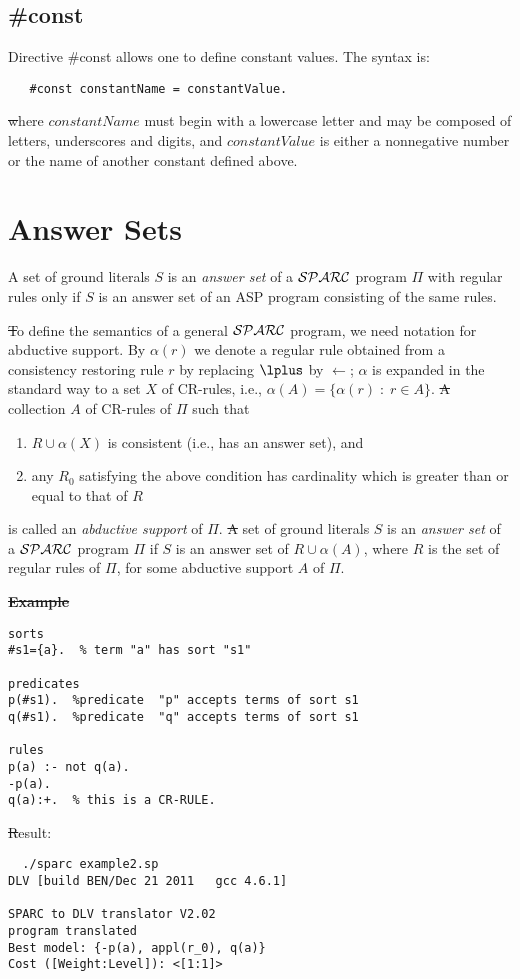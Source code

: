 \documentclass[12pt, letterpaper]{article}
\begin{document}
\subsection{\#const}
Directive \#const allows one to define constant values. The syntax is:
\begin{verbatim}
   #const constantName = constantValue.
\end{verbatim}      
\st where $constantName$  must begin with a lowercase letter and may be composed of letters, underscores and digits,
 and $constantValue$ is either a nonnegative number or the name of another constant defined above.  
\section{Answer Sets}
\noindent A set of ground literals $S$ is an {\em answer set} of a ${\cal SPARC}$ 
program $\Pi$ with regular rules only if $S$ is an answer set of an ASP program consisting of the same rules.

\st To define the semantics of a general ${\cal SPARC}$ program, we need notation for abductive support.
By $\alpha(r)$ we denote a regular rule
obtained from a consistency restoring rule $r$
by replacing $\lplus$ by $\leftarrow$;
$\alpha$ is expanded in the standard way to a set $X$ of CR-rules,
i.e., $\alpha(A) = \{\alpha(r)\; :\; r \in A\}$.
\st A %
collection $A$ of CR-rules of $\Pi$ such that
\begin{enumerate}
\item $R \cup \alpha(X)$ is consistent (i.e., has an answer set), and
\item any $R_0$ satisfying the above condition has cardinality
which is greater than or equal to that of $R$
\end{enumerate}
is called an {\em abductive support} of $\Pi$.
\st A set of ground literals $S$ is an {\em answer set} of a ${\cal SPARC}$ program 
$\Pi$ if $S$ is an answer set of $R \cup \alpha(A)$, where $R$ is the set of regular rules of $\Pi$, for some abductive
support $A$ of $\Pi$.

\st \textbf{Example}
\begin{verbatim}
sorts
#s1={a}.  % term "a" has sort "s1"

predicates
p(#s1).  %predicate  "p" accepts terms of sort s1 
q(#s1).  %predicate  "q" accepts terms of sort s1 

rules
p(a) :- not q(a).
-p(a).
q(a):+.  % this is a CR-RULE. 
\end{verbatim}
\st Result:
\begin{verbatim}
  ./sparc example2.sp
DLV [build BEN/Dec 21 2011   gcc 4.6.1]

SPARC to DLV translator V2.02
program translated
Best model: {-p(a), appl(r_0), q(a)}
Cost ([Weight:Level]): <[1:1]>

\end{verbatim}
\end{document}
